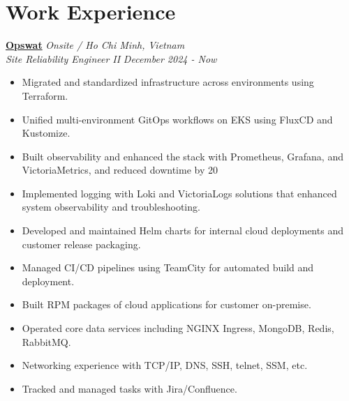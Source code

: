 \documentclass[11pt, a4paper]{article}
\begin{document}
\section{Work Experience}
\textbf{\href{https://www.opswat.com/}{Opswat}} \hfill {\small\textit{Onsite / Ho Chi Minh, Vietnam}} \\
\textit{Site Reliability Engineer II} \hfill {\small\textit{December 2024 - Now}}
\begin{itemize}[leftmargin=*]
    \item Migrated and standardized infrastructure across environments using Terraform.
    \item Unified multi-environment GitOps workflows on EKS using FluxCD and Kustomize.
    \item Built observability and enhanced the stack with Prometheus, Grafana, and VictoriaMetrics, and reduced downtime by 20%
    \item Implemented logging with Loki and VictoriaLogs solutions that enhanced system observability and troubleshooting.
    \item Developed and maintained Helm charts for internal cloud deployments and customer release packaging.
    \item Managed CI/CD pipelines using TeamCity for automated build and deployment.
    \item Built RPM packages of cloud applications for customer on-premise.
    \item Operated core data services including NGINX Ingress, MongoDB, Redis, RabbitMQ.
    \item Networking experience with TCP/IP, DNS, SSH, telnet, SSM, etc.
    \item Tracked and managed tasks with Jira/Confluence.
\end{itemize}
\end{document}
